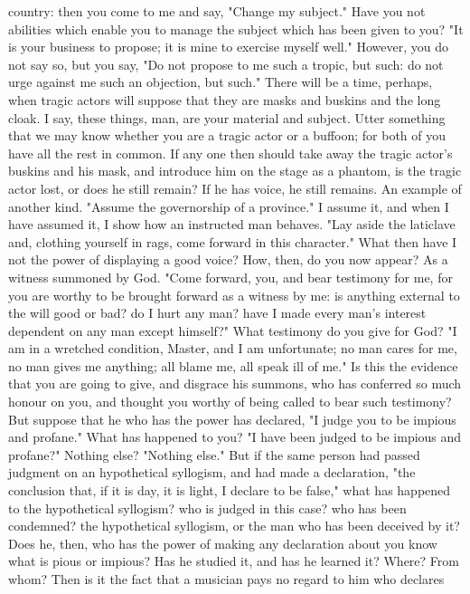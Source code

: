 \documentclass[a4paper]{article}
\begin{document}
country: then you come to me and say, "Change my subject." Have you not
abilities which enable you to manage the subject which has been given to you?
"It is your business to propose; it is mine to exercise myself well." However,
you do not say so, but you say, "Do not propose to me such a tropic, but such:
do not urge against me such an objection, but such." There will be a time,
perhaps, when tragic actors will suppose that they are masks and buskins and
the long cloak. I say, these things, man, are your material and subject. Utter
something that we may know whether you are a tragic actor or a buffoon; for
both of you have all the rest in common. If any one then should take away the
tragic actor's buskins and his mask, and introduce him on the stage as a
phantom, is the tragic actor lost, or does he still remain? If he has voice, he
still remains.
    An example of another kind. "Assume the governorship of a province." I
assume it, and when I have assumed it, I show how an instructed man behaves.
"Lay aside the laticlave and, clothing yourself in rags, come forward in this
character." What then have I not the power of displaying a good voice? How,
then, do you now appear? As a witness summoned by God. "Come forward, you, and
bear testimony for me, for you are worthy to be brought forward as a witness by
me: is anything external to the will good or bad? do I hurt any man? have I
made every man's interest dependent on any man except himself?" What testimony
do you give for God? "I am in a wretched condition, Master, and I am
unfortunate; no man cares for me, no man gives me anything; all blame me, all
speak ill of me." Is this the evidence that you are going to give, and disgrace
his summons, who has conferred so much honour on you, and thought you worthy of
being called to bear such testimony?
    But suppose that he who has the power has declared, "I judge you to be
impious and profane." What has happened to you? "I have been judged to be
impious and profane?" Nothing else? "Nothing else." But if the same person had
passed judgment on an hypothetical syllogism, and had made a declaration, "the
conclusion that, if it is day, it is light, I declare to be false," what has
happened to the hypothetical syllogism? who is judged in this case? who has
been condemned? the hypothetical syllogism, or the man who has been deceived by
it? Does he, then, who has the power of making any declaration about you know
what is pious or impious? Has he studied it, and has he learned it? Where? From
whom? Then is it the fact that a musician pays no regard to him who declares
\end{document}

